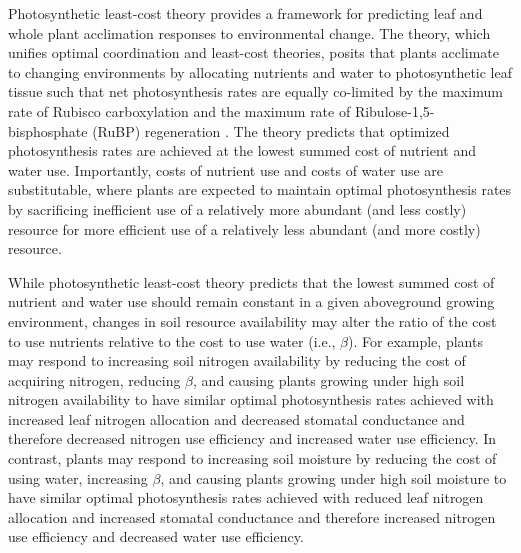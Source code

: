 Photosynthetic least-cost theory  provides a framework for predicting leaf and whole plant acclimation responses to environmental change. The theory, which unifies optimal coordination  and least-cost  theories, posits that plants acclimate to changing environments by allocating nutrients and water to photosynthetic leaf tissue such that net photosynthesis rates are equally co-limited by the maximum rate of Rubisco carboxylation and the maximum rate of Ribulose-1,5-bisphosphate (RuBP) regeneration . The theory predicts that optimized photosynthesis rates are achieved at the lowest summed cost of nutrient and water use. Importantly, costs of nutrient use and costs of water use are substitutable, where plants are expected to maintain optimal photosynthesis rates by sacrificing inefficient use of a relatively more abundant (and less costly) resource for more efficient use of a relatively less abundant (and more costly) resource. 

While photosynthetic least-cost theory predicts that the lowest summed cost of nutrient and water use should remain constant in a given aboveground growing environment, changes in soil resource availability may alter the ratio of the cost to use nutrients relative to the cost to use water (i.e., $\beta$). For example, plants may respond to increasing soil nitrogen availability by reducing the cost of acquiring nitrogen, reducing $\beta$, and causing plants growing under high soil nitrogen availability to have similar optimal photosynthesis rates achieved with increased leaf nitrogen allocation and decreased stomatal conductance and therefore decreased nitrogen use efficiency and increased water use efficiency. In contrast, plants may respond to increasing soil moisture by reducing the cost of using water, increasing $\beta$, and causing plants growing under high soil moisture to have similar optimal photosynthesis rates achieved with reduced leaf nitrogen allocation and increased stomatal conductance and therefore increased nitrogen use efficiency and decreased water use efficiency.

